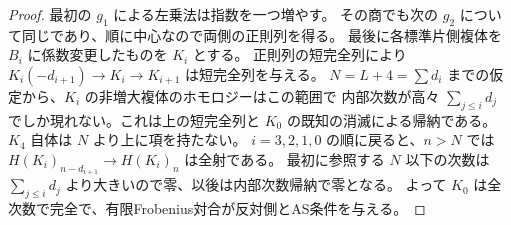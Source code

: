 \begin{proof}
最初の $g_1$ による左乗法は指数を一つ増やす。
その商でも次の $g_2$ について同じであり、順に中心なので両側の正則列を得る。
最後に各標準片側複体を $B_i$ に係数変更したものを $K_i$ とする。
正則列の短完全列により $K_i(-d_{i+1})\to K_i\to K_{i+1}$ は短完全列を与える。
$N=L+4=\sum d_i$ までの仮定から、$K_i$ の非増大複体のホモロジーはこの範囲で
内部次数が高々 $\sum_{j\le i}d_j$ でしか現れない。これは上の短完全列と $K_0$ の既知の消滅による帰納である。
$K_4$ 自体は $N$ より上に項を持たない。
$i=3,2,1,0$ の順に戻ると、$n>N$ では $H(K_i)_{n-d_{i+1}}\to H(K_i)_n$ は全射である。
最初に参照する $N$ 以下の次数は $\sum_{j\le i}d_j$ より大きいので零、以後は内部次数帰納で零となる。
よって $K_0$ は全次数で完全で、有限Frobenius対合が反対側とAS条件を与える。
\end{proof}
